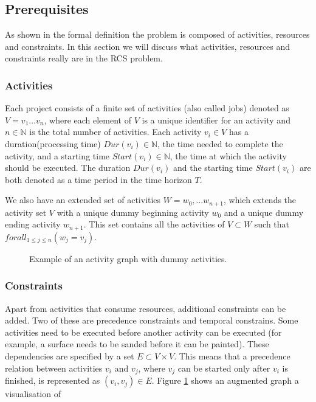 \documentclass{article}
\newcommand{\dur}[1]{\textit{Dur}(#1)} %
\newcommand{\start}[1]{\textit{Start}(#1)} %
\begin{document}
\subsection{Prerequisites}
As shown in the formal definition the problem is composed of activities, resources and constraints.
In this section we will discuss what activities, resources and constraints really are in the RCS problem.

\subsubsection{Activities}
Each project consists of a finite set of activities (also called jobs) denoted as $V = v_1 \ldots v_n$, where each element of $V$ is a unique identifier for an activity and $n \in \mathbb{N}$ is the total number of activities.
Each activity $v_i \in V$ has a duration(processing time) $\dur{v_i} \in \mathbb{N}$, the time needed to complete the activity, and a starting time $\start{v_i} \in \mathbb{N}$, the time at which the activity should be executed. The duration $\dur{v_i}$ and the starting time $\start{v_i}$ are both denoted as a time period in the time horizon $T$.

We also have an extended set of activities $W = w_0, \ldots w_{n+1}$, which extends the activity set $V$ with a unique dummy beginning activity $w_0$ and a unique dummy ending activity $w_{n+1}$. This set contains all the activities of $V \subset W$ such that $forall_{1 \leq j \leq n}(w_j = v_j)$.

\begin{figure}[h]
	\centering
	
	\caption{Example of an activity graph with dummy activities. }
	\label{fig:activity_graph}
\end{figure}

\subsubsection{Constraints}
Apart from activities that consume resources, additional constraints can be added.
Two of these are precedence constraints and temporal constrains.
Some activities need to be executed before another activity can be executed (for example, a surface needs to be sanded before it can be painted).
These dependencies are specified by a set $E \subset V \times V$.
This means that a precedence relation between activities $v_i$ and $v_j$, where $v_j$ can be started only after $v_i$ is finished, is represented as $(v_i, v_j) \in E$. 
Figure \ref{fig:activity_graph} shows an augmented graph a visualisation of 
\end{document}
